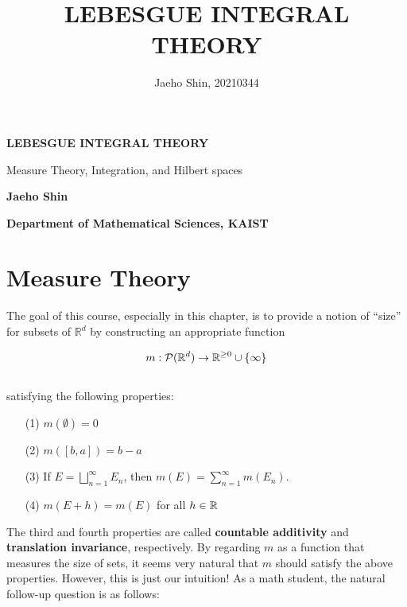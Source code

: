 \documentclass[12pt, a4paper, openany, twoside]{book}
\author{Jaeho Shin, 20210344}
\title{LEBESGUE INTEGRAL THEORY}
\theoremstyle{definition}
\theoremstyle{remark}
\theoremstyle{plain}
\numberwithin{equation}{section}
\begin{document}
\begin{titlepage}
    \begin{center}
        \vspace*{9cm}
            
        \Huge
        \textbf{LEBESGUE INTEGRAL THEORY}
    
        \vspace{1cm}
        \large
        Measure Theory, Integration, and Hilbert spaces
        \vspace{3cm}
        
        \LARGE
        \textbf{Jaeho Shin}
            
        \vspace{8cm}
            
        \normalsize
        \textbf{Department of Mathematical Sciences, KAIST}\\  
    \end{center}
\end{titlepage}

\hypersetup{linkcolor=black}
\tableofcontents
\hypersetup{linkcolor=blue}

\newpage

\chapter{Measure Theory}\mbox{}

The goal of this course, especially in this chapter, is to provide a notion of “size” for subsets of $\mathbb{R}^d$ by constructing an appropriate function

\[m:\mathcal{P}({\mathbb {R}}^d)\rightarrow{\mathbb {R}}^{\geq 0}\cup\{\infty\}\]
\\
satisfying the following properties:
\begin{enumerate}
    \item [(1)] $m(\emptyset)=0$
    \item [(2)] $m([b,a])=b-a$
    \item [(3)] If $E=\bigsqcup_{n=1}^{\infty}{E_n}$, then $m(E)=\sum_{n=1}^{\infty}{m(E_n)}$.
    \item [(4)] $m(E+h)=m(E)$ for all $h\in{\mathbb {R}}$
\end{enumerate}
The third and fourth properties are called \textbf{countable additivity} and \textbf{translation invariance}, respectively. 
By regarding $m$ as a function that measures the size of sets, it seems very natural that $m$ should satisfy the above properties. 
However, this is just our intuition! As a math student, the natural follow-up question is as follows:
\end{document}
